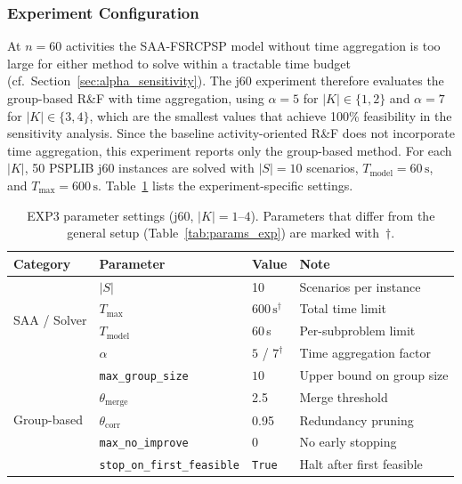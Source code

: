\subsubsection*{Experiment Configuration}
At $n=60$ activities the SAA-FSRCPSP model without time
aggregation is too large for either method to solve within a
tractable time budget (cf.\ Section~\ref{sec:alpha_sensitivity}).
The j60 experiment therefore evaluates the group-based R\&F with
time aggregation, using $\alpha = 5$ for $|K| \in \{1,2\}$ and
$\alpha = 7$ for $|K| \in \{3,4\}$, which are the smallest values that
achieve 100\% feasibility in the sensitivity analysis. Since the
baseline activity-oriented R\&F does not incorporate time
aggregation, this experiment reports only the group-based method.
For each $|K|$, 50 PSPLIB j60 instances are solved with
$|S| = 10$ scenarios, $T_{\mathrm{model}} = 60\,\text{s}$, and
$T_{\max} = 600\,\text{s}$. Table~\ref{tab:exp3_params} lists
the experiment-specific settings.
\begin{table}[htbp]
\centering
\renewcommand{\arraystretch}{1.35}
\caption{EXP3 parameter settings (j60, $|K|=1\text{--}4$).
         Parameters that differ from the general setup
         (Table~\ref{tab:params_exp}) are marked with~$\dagger$.}
\label{tab:exp3_params}
\begin{tabular}{llll}
\hline
\textbf{Category} & \textbf{Parameter} & \textbf{Value} & \textbf{Note} \\
\hline
\multirow{4}{*}{SAA / Solver}
    & $|S|$                               & 10                     & Scenarios per instance \\
    & $T_{\max}$                          & $600\,\text{s}^\dagger$ & Total time limit \\
    & $T_{\mathrm{model}}$                & 60\,s                  & Per-subproblem limit \\
    & $\alpha$                            & $5$ / $7^\dagger$      & Time aggregation factor \\
\hline
\multirow{5}{*}{Group-based}
    & \texttt{max\_group\_size}           & $10$                   & Upper bound on group size \\
    & $\theta_{\mathrm{merge}}$           & 2.5                    & Merge threshold \\
    & $\theta_{\mathrm{corr}}$            & 0.95                   & Redundancy pruning \\
    & \texttt{max\_no\_improve}           & 0                      & No early stopping \\
    & \texttt{stop\_on\_first\_feasible}  & \texttt{True}          & Halt after first feasible \\
\hline
\end{tabular}
\end{table}
